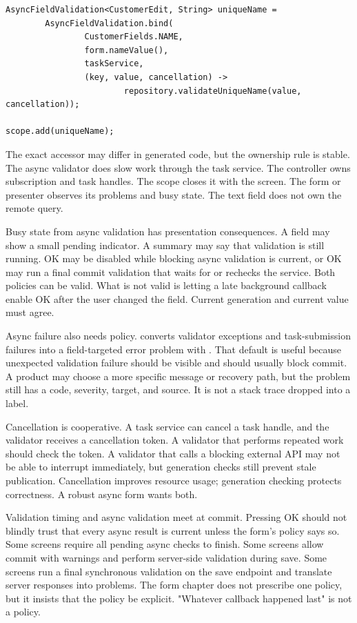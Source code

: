 \begin{lstlisting}[caption={Async validation is a lifecycle-owned relationship.}]
AsyncFieldValidation<CustomerEdit, String> uniqueName =
        AsyncFieldValidation.bind(
                CustomerFields.NAME,
                form.nameValue(),
                taskService,
                (key, value, cancellation) ->
                        repository.validateUniqueName(value, cancellation));

scope.add(uniqueName);
\end{lstlisting}

The exact accessor may differ in generated code, but the ownership rule is
stable. The async validator does slow work through the task service. The
controller owns subscription and task handles. The scope closes it with the
screen. The form or presenter observes its problems and busy state. The text
field does not own the remote query.

Busy state from async validation has presentation consequences. A field may
show a small pending indicator. A summary may say that validation is still
running. OK may be disabled while blocking async validation is current, or OK
may run a final commit validation that waits for or rechecks the service. Both
policies can be valid. What is not valid is letting a late background callback
enable OK after the user changed the field. Current generation and current
value must agree.

Async failure also needs policy.  converts validator
exceptions and task-submission failures into a field-targeted error problem
with . That default is useful because unexpected
validation failure should be visible and should usually block commit. A product
may choose a more specific message or recovery path, but the problem still has
a code, severity, target, and source. It is not a stack trace dropped into a
label.

Cancellation is cooperative. A task service can cancel a task handle, and the
validator receives a cancellation token. A validator that performs repeated
work should check the token. A validator that calls a blocking external API
may not be able to interrupt immediately, but generation checks still prevent
stale publication. Cancellation improves resource usage; generation checking
protects correctness. A robust async form wants both.

Validation timing and async validation meet at commit. Pressing OK should not
blindly trust that every async result is current unless the form's policy says
so. Some screens require all pending async checks to finish. Some screens allow
commit with warnings and perform server-side validation during save. Some
screens run a final synchronous validation on the save endpoint and translate
server responses into problems. The form chapter does not prescribe one
policy, but it insists that the policy be explicit. "Whatever callback happened
last" is not a policy.

